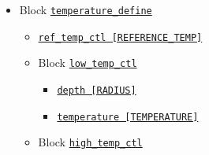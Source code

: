 \begin{itemize}
\begin{itemize}
\begin{itemize}
\begin{itemize}
				{\tt coef\_4\_induction\_ctl  [Name] [Power]}
			\end{itemize}
%
		\item Block \hyperref[href_t:composition]{\tt composition}
			\begin{itemize} \label{href_i:composition}
			\item Array \hyperref[href_t:coef_4_composition_ctl]
				{\tt coef\_4\_composition\_ctl         [Name] [Power]}
			\item Array \hyperref[href_t:coef_4_c_diffuse_ctl]
				{\tt coef\_4\_c\_diffuse\_ctl          [Name] [Power]}
			\item Array \hyperref[href_t:coef_4_composition_source_ctl]
				{\tt coef\_4\_composition\_source\_ctl [Name] [Power]}
			\end{itemize}
		\end{itemize}
%
%
%
	\item Block \hyperref[href_t:temperature_define]{\tt temperature\_define}
		\begin{itemize} \label{href_i:temperature_define}
		\item \verb||
				\hyperref[href_t:ref_temp_ctl]{\tt ref\_temp\_ctl        [REFERENCE\_TEMP]}
		\item Block \hyperref[href_t:low_temp_ctl]{\tt low\_temp\_ctl}
			\begin{itemize}
			\item \hyperref[href_t:depth]      {\tt depth        [RADIUS]}
			\item \hyperref[href_t:temperature]{\tt temperature  [TEMPERATURE]}
			\end{itemize}
%
		\item Block \hyperref[href_t:high_temp_ctl]{\tt high\_temp\_ctl}
			\begin{itemize}

\end{itemize}
\end{itemize}
\end{itemize}
\end{itemize}
